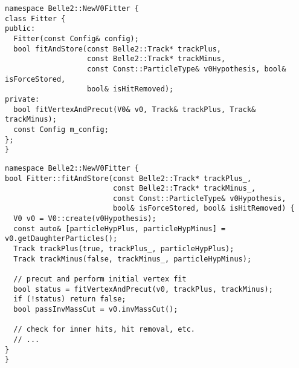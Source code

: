 \begin{verbatim}
namespace Belle2::NewV0Fitter {
class Fitter {
public:
  Fitter(const Config& config);
  bool fitAndStore(const Belle2::Track* trackPlus,
                   const Belle2::Track* trackMinus,
                   const Const::ParticleType& v0Hypothesis, bool& isForceStored,
                   bool& isHitRemoved);
private:
  bool fitVertexAndPrecut(V0& v0, Track& trackPlus, Track& trackMinus);
  const Config m_config;
};
}
\end{verbatim}
\tcblower%
\begin{verbatim}
namespace Belle2::NewV0Fitter {
bool Fitter::fitAndStore(const Belle2::Track* trackPlus_,
                         const Belle2::Track* trackMinus_,
                         const Const::ParticleType& v0Hypothesis,
                         bool& isForceStored, bool& isHitRemoved) {
  V0 v0 = V0::create(v0Hypothesis);
  const auto& [particleHypPlus, particleHypMinus] = v0.getDaughterParticles();
  Track trackPlus(true, trackPlus_, particleHypPlus);
  Track trackMinus(false, trackMinus_, particleHypMinus);

  // precut and perform initial vertex fit
  bool status = fitVertexAndPrecut(v0, trackPlus, trackMinus); 
  if (!status) return false;
  bool passInvMassCut = v0.invMassCut();

  // check for inner hits, hit removal, etc.
  // ...
}
}    
\end{verbatim}